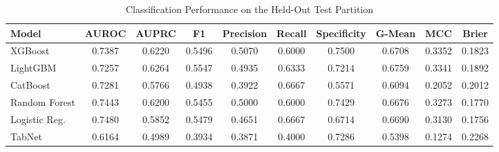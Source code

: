 \begin{table}
\centering
\caption{Classification Performance on the Held-Out Test Partition}
\label{tab:results}
\begin{tabular}{lccccccccc}
\toprule
Model & AUROC & AUPRC & F1 & Precision & Recall & Specificity & G-Mean & MCC & Brier \\
\midrule
XGBoost & 0.7387 & 0.6220 & 0.5496 & 0.5070 & 0.6000 & 0.7500 & 0.6708 & 0.3352 & 0.1823 \\
LightGBM & 0.7257 & 0.6264 & 0.5547 & 0.4935 & 0.6333 & 0.7214 & 0.6759 & 0.3341 & 0.1892 \\
CatBoost & 0.7281 & 0.5766 & 0.4938 & 0.3922 & 0.6667 & 0.5571 & 0.6094 & 0.2052 & 0.2012 \\
Random Forest & 0.7443 & 0.6200 & 0.5455 & 0.5000 & 0.6000 & 0.7429 & 0.6676 & 0.3273 & 0.1770 \\
Logistic Reg. & 0.7480 & 0.5852 & 0.5479 & 0.4651 & 0.6667 & 0.6714 & 0.6690 & 0.3130 & 0.1756 \\
TabNet & 0.6164 & 0.4989 & 0.3934 & 0.3871 & 0.4000 & 0.7286 & 0.5398 & 0.1274 & 0.2268 \\
\bottomrule
\end{tabular}
\end{table}
